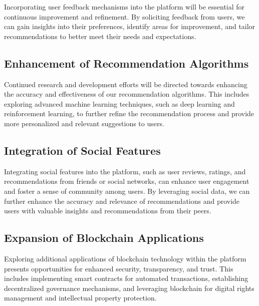 \documentclass{article}
\begin{document}
Incorporating user feedback mechanisms into the platform will be essential for continuous improvement and refinement. By soliciting feedback from users, we can gain insights into their preferences, identify areas for improvement, and tailor recommendations to better meet their needs and expectations.

\subsection{Enhancement of Recommendation Algorithms}

Continued research and development efforts will be directed towards enhancing the accuracy and effectiveness of our recommendation algorithms. This includes exploring advanced machine learning techniques, such as deep learning and reinforcement learning, to further refine the recommendation process and provide more personalized and relevant suggestions to users.

\subsection{Integration of Social Features}

Integrating social features into the platform, such as user reviews, ratings, and recommendations from friends or social networks, can enhance user engagement and foster a sense of community among users. By leveraging social data, we can further enhance the accuracy and relevance of recommendations and provide users with valuable insights and recommendations from their peers.

\subsection{Expansion of Blockchain Applications}

Exploring additional applications of blockchain technology within the platform presents opportunities for enhanced security, transparency, and trust. This includes implementing smart contracts for automated transactions, establishing decentralized governance mechanisms, and leveraging blockchain for digital rights management and intellectual property protection.
\end{document}
